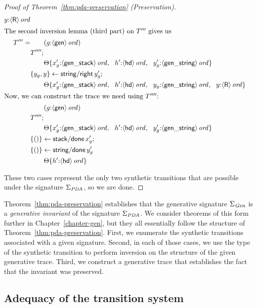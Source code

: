 \begin{proof}[Proof of Theorem~\ref{thm:pda-preservation} (Preservation)]
\begin{align*}
{                   y{:}{\langle {\sf R} \rangle}\,{{\it ord}}}\\
\intertext{The second inversion lemma (third part) on $T'''$ gives us}
T''' = & \qquad ({g{:}{\langle {\sf gen} \rangle}\,{{\it ord}}})\\
& T'''';\\
& \qquad {\Theta}\{{x_g'{:}{\langle {\sf gen\_stack} \rangle}\,{{\it ord}}, ~~
                   h'{:}{\langle {\sf hd} \rangle}\,{{\it ord}}, ~~
                   y_g'{:}{\langle {\sf gen\_string} \rangle}\,{{\it ord}}}\}\\
& \{{y_g, y}\} \leftarrow {{\sf string/right}\,y_g'};\\
& \qquad {\Theta}\{{x_g'{:}{\langle {\sf gen\_stack} \rangle}\,{{\it ord}}, ~~
                   h'{:}{\langle {\sf hd} \rangle}\,{{\it ord}}, ~~
                   y_g{:}{\langle {\sf gen\_string} \rangle}\,{{\it ord}}, ~~
                   y{:}{\langle {\sf R} \rangle}\,{{\it ord}}}\}\\
\intertext{Now, we can construct the trace we need using $T''''$:}
& \qquad ({g{:}{\langle {\sf gen} \rangle}\,{{\it ord}}})\\
& T'''';\\
& \qquad {\Theta}\{{x_g'{:}{\langle {\sf gen\_stack} \rangle}\,{{\it ord}}, ~~
                   h'{:}{\langle {\sf hd} \rangle}\,{{\it ord}}, ~~
                   y_g'{:}{\langle {\sf gen\_string} \rangle}\,{{\it ord}}}\}\\
& \{{()}\} \leftarrow {{\sf stack/done}\,x_g'};\\
& \{{()}\} \leftarrow {{\sf string/done}\,y_g'}\\
& \qquad {\Theta}\{{h'{:}{\langle {\sf hd} \rangle}\,{{\it ord}}}\}
\end{align*}

\noindent
These two cases represent the only two synthetic transitions that are possible
under the signature $\Sigma_{\it PDA}$, so we are done.
\end{proof}

Theorem~\ref{thm:pda-preservation} establishes that the generative
signature $\Sigma_{\it Gen}$ is a {\it generative invariant} of the
signature $\Sigma_{\it PDA}$. We consider theorems of this form
further in Chapter~\ref{chapter-gen}, but they all essentially follow
the structure of Theorem~\ref{thm:pda-preservation}. First, we
enumerate the synthetic transitions associated with a given
signature. Second, in each of those cases, we use the type of the
synthetic transition to perform inversion on the structure of the
given generative trace.  Third, we construct a generative trace that
establishes the fact that the invariant was preserved.

\subsection{Adequacy of the transition system}
\label{sec:pda-adequacy}

